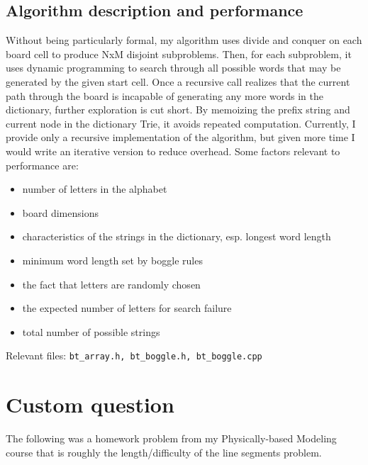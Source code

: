 \documentclass{article}
\begin{document}
\subsection{Algorithm description and performance}

Without being particularly formal, my algorithm uses divide and conquer on each
board cell to produce NxM disjoint subproblems. Then, for each subproblem, it
uses dynamic programming to search through all possible words that may be
generated by the given start cell. Once a recursive call realizes that the
current path through the board is incapable of generating any more words in the
dictionary, further exploration is cut short. By memoizing the prefix string
and current node in the dictionary Trie, it avoids repeated computation.
Currently, I provide only a recursive implementation of the algorithm, but
given more time I would write an iterative version to reduce overhead. Some
factors relevant to performance are:
\begin{itemize}
  \item number of letters in the alphabet
  \item board dimensions
  \item characteristics of the strings in the dictionary, esp. longest word length
  \item minimum word length set by boggle rules
  \item the fact that letters are randomly chosen
  \item the expected number of letters for search failure
  \item total number of possible strings
\end{itemize}

% 

\vspace{1em}
\noindent Relevant files: \texttt{bt\_array.h, bt\_boggle.h, bt\_boggle.cpp}

\section{Custom question}

The following was a homework problem from my Physically-based Modeling course
that is roughly the length/difficulty of the line segments problem. 
\end{document}
